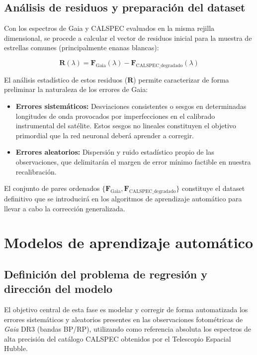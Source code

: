 \documentclass{article}
\begin{document}
\subsection{Análisis de residuos y preparación del dataset}

Con los espectros de Gaia y CALSPEC evaluados en la misma rejilla dimensional, se procede a calcular el vector de residuos inicial para la muestra de estrellas comunes (principalmente enanas blancas):

\begin{equation}
\mathbf{R}(\lambda) = \mathbf{F}_{\text{Gaia}}(\lambda) - \mathbf{F}_{\text{CALSPEC\_degradado}}(\lambda)
\end{equation}

El análisis estadístico de estos residuos ($\mathbf{R}$) permite caracterizar de forma preliminar la naturaleza de los errores de Gaia:
\begin{itemize}
    \item \textbf{Errores sistemáticos:} Desviaciones consistentes o sesgos en determinadas longitudes de onda provocados por imperfecciones en el calibrado instrumental del satélite. Estos sesgos no lineales constituyen el objetivo primordial que la red neuronal deberá aprender a corregir.
    \item \textbf{Errores aleatorios:} Dispersión y ruido estadístico propio de las observaciones, que delimitarán el margen de error mínimo factible en nuestra recalibración.
\end{itemize}

El conjunto de pares ordenados $\{\mathbf{F}_{\text{Gaia}}, \mathbf{F}_{\text{CALSPEC\_degradado}}\}$ constituye el dataset definitivo que se introducirá en los algoritmos de aprendizaje automático para llevar a cabo la corrección generalizada.



\newpage
\newpage
\section{Modelos de aprendizaje automático}

\subsection{Definición del problema de regresión y dirección del modelo}

El objetivo central de esta fase es modelar y corregir de forma automatizada los errores sistemáticos y aleatorios presentes en las observaciones fotométricas de \textit{Gaia} DR3 (bandas BP/RP), utilizando como referencia absoluta los espectros de alta precisión del catálogo CALSPEC obtenidos por el Telescopio Espacial Hubble.
\end{document}
